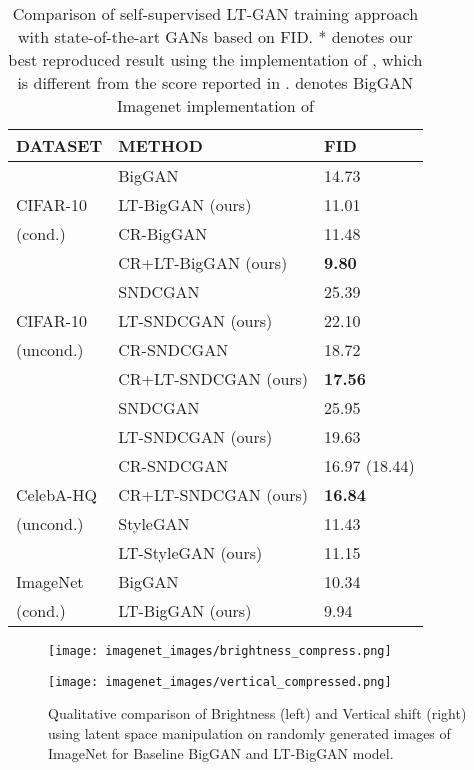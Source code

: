 \documentclass[10pt,twocolumn,letterpaper]{article}
\begin{document}
\begin{table}[t]
\begin{tabular}{lll}
\hline
DATASET   & METHOD               & FID    \\ \hline
          & BigGAN       & 14.73  \\
CIFAR-10  & LT-BigGAN (ours)    & 11.01    \\
(cond.)   & CR-BigGAN     & 11.48   \\
          & CR+LT-BigGAN (ours) & \textbf{9.80}   \\ \hline
          & SNDCGAN        & 25.39  \\
CIFAR-10  & LT-SNDCGAN (ours)    & 22.10   \\
(uncond.) & CR-SNDCGAN   & 18.72  \\
          & CR+LT-SNDCGAN (ours) & \textbf{17.56}   \\ \hline
          & SNDCGAN              & 25.95  \\
          & LT-SNDCGAN  (ours)         & 19.63  \\
          & CR-SNDCGAN          & 16.97 (18.44) \\
CelebA-HQ & CR+LT-SNDCGAN (ours)      & \textbf{16.84}  \\ \cline{2-3}
(uncond.)          & StyleGAN             & 11.43  \\
          & LT-StyleGAN (ours)         & 11.15  \\ \hline
ImageNet  & BigGAN        & 10.34 \\
(cond.)   & LT-BigGAN (ours)    & 9.94  \\ \hline
\end{tabular}
\caption{\footnotesize{Comparison of self-supervised LT-GAN training approach with state-of-the-art GANs based on FID. * denotes our best reproduced result using the implementation of , which is different from the score reported in \cite{crgan2019chen}.  denotes BigGAN Imagenet implementation of }}
\label{tab:sota-table}
\end{table}


\begin{figure*}[t]
\centering
    \begin{minipage}{.45\textwidth}
      \texttt{[image: imagenet\_images/brightness\_compress.png]}
    \end{minipage}\hspace{0.5cm}
    \begin{minipage}{.45\textwidth}
      \texttt{[image: imagenet\_images/vertical\_compressed.png]}
    \end{minipage}
    \caption{\footnotesize{Qualitative comparison of Brightness (left) and Vertical shift (right) using latent space manipulation on randomly generated images of ImageNet for Baseline BigGAN and LT-BigGAN model.}}
    \label{fig:brightness}
\end{figure*}
\end{document}

